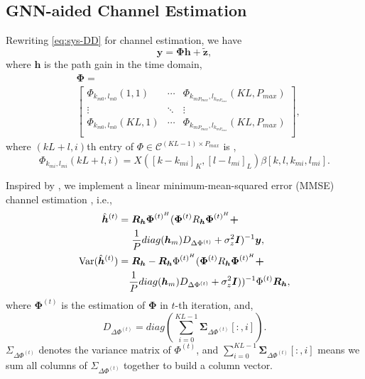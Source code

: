 \documentclass[journal]{IEEEtran}
\begin{document}
\subsection{GNN-aided Channel Estimation}
Rewriting \eqref{eq:sys-DD} for channel estimation, we have
\begin{equation}
\bm y = \bm\Phi \bm h + \bm{\tilde{z}},
\label{eq:GCHE-sys}
\end{equation}
where $\bm h$ is the path gain in the time domain,  
\[
\begin{split}
& \bm\Phi = \\
& \begin{bmatrix}
    \Phi_{k_{m0}, l_{m0}}(1, 1) & \cdots & \Phi_{k_{mP_{max}}, l_{k_{mP_{max}}}}(KL, P_{max}) \\ 
	\vdots & \ddots  & \vdots \\  
    \Phi_{k_{m0}, l_{m0}}(KL, 1) & \cdots & \Phi_{k_{mP_{max}}, l_{k_{mP_{max}}}}(KL, P_{max}) \\
\end{bmatrix},
\end{split}
\]
where $(kL+l, i)$th entry of $\Phi \in \mathcal{C}^{(KL-1)\times P_{max}}$ is \cite{9785832},
\begin{dmath}
\Phi_{k_{mi}, l_{mi}}(kL+l, i) = X([k-k_{mi}]_K, [l-l_{mi}]_L)\beta[k, l, k_{mi}, l_{mi}].
\end{dmath}

Inspired by \cite{945004, 5493831}, we implement a linear minimum-mean-squared
error (MMSE) channel estimation , i.e.,
\begin{subequations}
\begin{align}
\hat{\bm h}^{(t)} = & \hspace{0.3em} \bm R_{\bm h}\bm\Phi^{(t)^H}(\bm \Phi^{(t)}R_{\bm h}\bm\Phi^{(t)^H}\bm + \notag \\
& \hspace{0.3em} \frac{1}{P} diag(\bm h_m) D_{\Delta \Phi^{(t)}} +\sigma_z^2\bm I)^{-1}\bm y, \label{eq:GCHE-mean} \\
\text{Var}(\hat{\bm h}^{(t)}) = & \hspace{0.3em} \bm R_{\bm h} - \bm R_{\bm h}\Phi^{(t)^H} (\bm \Phi^{(t)} R_{\bm h} \bm\Phi^{(t)^{H}}\bm + \notag\\
\hspace{0.3em}& \frac{1}{P} diag(\bm h_m) D_{\Delta \Phi^{(t)}} +\sigma_z^2\bm I))^{-1} \Phi^{(t)}\bm R_{\bm h} \label{eq:GCHE-var}, \\
\end{align}
\end{subequations}
where $\bm\Phi^{(t)}$ is the estimation of $\bm\Phi$ in $t$-th iteration, and,
\begin{equation}
D_{\Delta \Phi^{(t)}} = diag(\sum_{i=0}^{KL-1}\bm \Sigma_{\Delta \Phi^{(t)}}[:, i]).
\end{equation}
$\Sigma_{\Delta\Phi^{(t)}}$ denotes the variance matrix of $\Phi^{(t)}$, and $\sum_{i=0}^{KL-1}\bm \Sigma_{\Delta \Phi^{(t)}}[:, i]$ means we sum all columns of $\Sigma_{\Delta\Phi^{(t)}}$ together to build a column vector.
\end{document}
